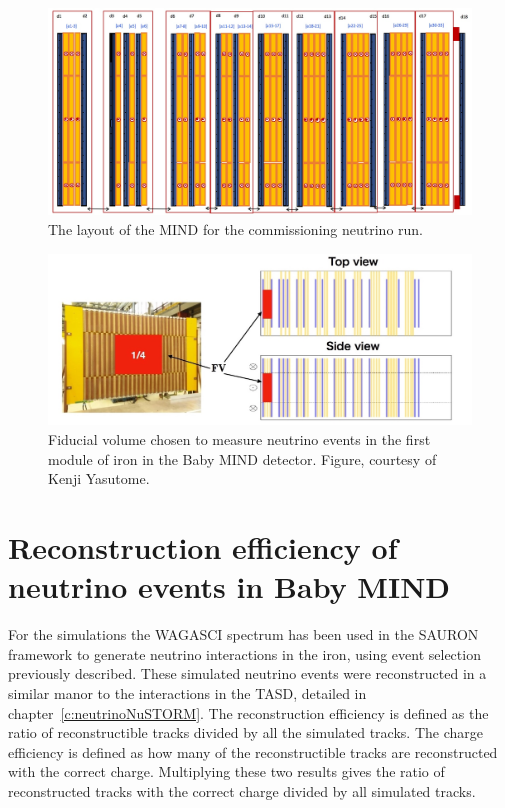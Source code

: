 \begin{figure}
\centering
\includegraphics[width=\textwidth]{figures/NeutrinoChap/NuFactTalk/Layout300118.jpeg}
\caption{The layout of the MIND for the commissioning neutrino run.}
\label{fig:MINDneutrinoLayout}
\end{figure}

\begin{figure}
\centering
\includegraphics[width=\textwidth]{figures/NeutrinoChap/NuFactTalk/eventRateCheck.jpeg}
\caption{Fiducial volume chosen to measure neutrino events in the first module of iron in the Baby MIND detector. Figure, courtesy of Kenji Yasutome.}
\label{fig:MINDFiducial}
\end{figure}

\section{Reconstruction efficiency of neutrino events in Baby MIND}


For the simulations the WAGASCI spectrum has been used in the SAURON framework to generate neutrino interactions in the iron, using event selection previously described. These simulated neutrino events were reconstructed in a similar manor to the interactions in the TASD, detailed in chapter~\ref{c:neutrinoNuSTORM}. The reconstruction efficiency is defined as the ratio of reconstructible tracks divided by all the simulated tracks. The charge efficiency is defined as how many of the reconstructible tracks are reconstructed with the correct charge. Multiplying these two results gives the ratio of reconstructed tracks with the correct charge divided by all simulated tracks.

